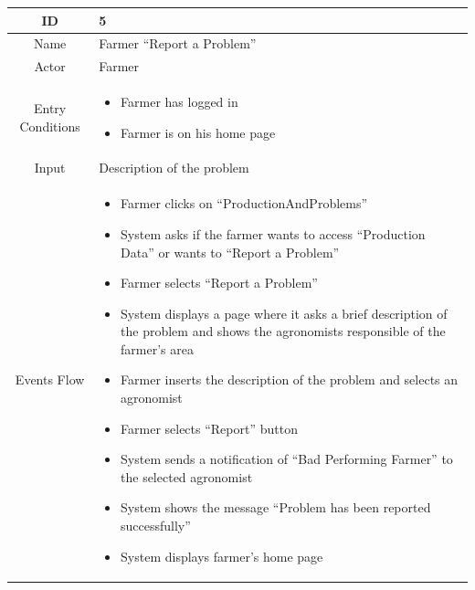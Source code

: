 \documentclass{article}
\begin{document}
\begin{center}
    
    
    
    
    
    
    \begin{longtable}{|c| p{10cm}|}
        \hline
            ID & 5 \\
        \hline
            Name & Farmer “Report a Problem”  \\
        \hline
            Actor & Farmer \\
        \hline
            Entry Conditions & 
                                \begin{itemize}
                                    \item Farmer has logged in
                                    \item Farmer is on his home page
                                \end{itemize}\\
        \hline
            Input & Description of the problem \\
        \hline
            Events Flow &   \begin{itemize}
                                \item Farmer clicks on “ProductionAndProblems” 
                                \item System asks if the farmer wants to access “Production Data” or wants to “Report a Problem”
                                \item Farmer selects “Report a Problem”
                                \item System displays a page where it asks a brief description of the problem and shows the agronomists responsible of the farmer’s area
                                \item Farmer inserts the description of the problem and selects an agronomist
                                \item Farmer selects “Report” button
                                \item System sends a notification of “Bad Performing Farmer” to the selected agronomist
                                \item System shows the message “Problem has been reported successfully” 
                                \item System displays farmer’s home page
                            \end{itemize} \\

\end{longtable}
\end{center}
\end{document}
